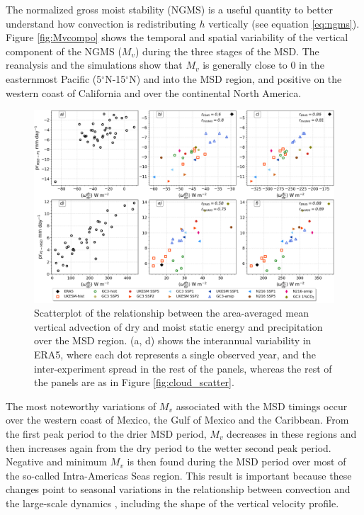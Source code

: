 The normalized gross moist stability (NGMS) is a useful quantity to better understand how convection is redistributing $h$ vertically (see equation \ref{eq:ngms}). Figure \ref{fig:Mvcompo} shows the temporal and spatial variability of the vertical component of the NGMS ($M_v$) during the three stages of the MSD. The reanalysis and the simulations show that $M_v$ is generally close to 0 in the easternmost Pacific (5$^\circ$N-15$^\circ$N) and into the MSD region, and positive on the western coast of California and over the continental North America.

\begin{figure}[t!]
\includegraphics[width=\linewidth]{figures/thermo_scatter}
\caption[Scatterplot of the vertical advection of dry and moist static energy against precipitation]{Scatterplot of the relationship between the area-averaged mean vertical advection of dry and moist static energy and precipitation over the MSD region. (a, d) shows the interannual variability in ERA5, where each dot represents a single observed year, and the inter-experiment spread in the rest of the panels, whereas the rest of the panels are as in Figure \ref{fig:cloud_scatter}.    }
\label{fig:thermo_scatter}
\end{figure}

 The most noteworthy variations of $M_v$ associated with the MSD timings occur over the western coast of  Mexico, the Gulf of Mexico and the Caribbean. From the first peak period to the drier MSD period, $M_v$ decreases in these regions and then increases again from the dry period to the wetter second peak period. Negative and minimum $M_v$ is then found during the MSD period over most of the so-called Intra-Americas Seas region. This result is important because these changes point to seasonal variations in the relationship between convection and the large-scale dynamics \citep{raymond2009}, including the shape of the vertical velocity profile.

